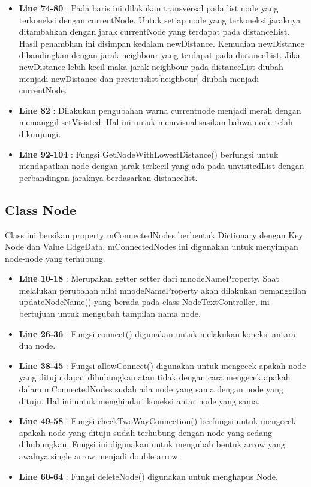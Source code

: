 \documentclass[12pt,a4paper,oneside]{article}
\begin{document}
\begin{itemize}
	\item \textbf{Line 74-80} : Pada baris ini dilakukan transversal pada list node yang terkoneksi dengan currentNode. Untuk setiap node yang terkoneksi jaraknya ditambahkan dengan jarak currentNode yang terdapat pada distanceList. Hasil penambhan ini disimpan kedalam newDistance. Kemudian newDistance dibandingkan dengan jarak neighbour yang terdapat pada distanceList. Jika newDistance lebih kecil maka jarak neighbour pada distanceList diubah menjadi newDistance dan previouslist[neighbour] diubah menjadi currentNode.
	\item \textbf{Line 82} : Dilakukan pengubahan warna currentnode menjadi merah dengan memanggil setVisisted. Hal ini untuk memvisualisasikan bahwa node telah dikunjungi.
	\item \textbf{Line 92-104} : Fungsi GetNodeWithLowestDistance() berfungsi untuk mendapatkan node dengan jarak terkecil yang ada pada unvisitedList dengan perbandingan jaraknya berdasarkan distancelist. 
\end{itemize}
\subsection{Class Node}
Class ini bersikan property mConnectedNodes berbentuk Dictionary dengan Key Node dan Value EdgeData. mConnectedNodes ini digunakan untuk menyimpan node-node yang terhubung.
\begin{itemize}
	\item \textbf{Line 10-18} : Merupakan getter setter dari mnodeNameProperty. Saat melalukan perubahan nilai mnodeNameProperty akan dilakukan pemanggilan updateNodeName() yang berada pada class NodeTextController, ini bertujuan untuk mengubah tampilan nama node.
	\item \textbf{Line 26-36} : Fungsi connect() digunakan untuk melakukan koneksi antara dua node.
	\item \textbf{Line 38-45} : Fungsi allowConnect() digunakan untuk mengecek apakah node yang dituju dapat dihubungkan atau tidak dengan cara mengecek apakah dalam mConnectedNodes sudah ada node yang sama dengan node yang dituju. Hal ini untuk menghindari koneksi antar node yang sama.
	\item \textbf{Line 49-58} : Fungsi checkTwoWayConnection() berfungsi untuk mengecek apakah node yang dituju sudah terhubung dengan node yang sedang dihubungkan. Fungsi ini digunakan untuk mengubah bentuk arrow yang awalnya single arrow menjadi double arrow. 
	\item \textbf{Line 60-64} : Fungsi deleteNode() digunakan untuk menghapus Node.
\end{itemize}
\end{document}

